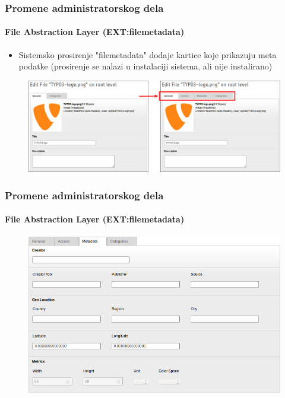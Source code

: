 
\begin{frame}[fragile]
	\frametitle{Promene administratorskog dela}
	\framesubtitle{File Abstraction Layer (EXT:filemetadata)}

	\begin{itemize}
		\item Sistemsko prosirenje "filemetadata" dodaje kartice koje prikazuju meta podatke\newline
			\small(prosirenje se nalazi u instalaciji sistema, ali nije instalirano)\normalsize
	\end{itemize}

	\begin{figure}
		\includegraphics[width=0.95\linewidth]{Images/BackendChanges/FileMetaDataTabs.png}
	\end{figure}

\end{frame}


\begin{frame}[fragile]
	\frametitle{Promene administratorskog dela}
	\framesubtitle{File Abstraction Layer (EXT:filemetadata)}

	\begin{figure}
		\includegraphics[width=0.8\linewidth]{Images/BackendChanges/FileMetaData.png}
	\end{figure}

\end{frame}

